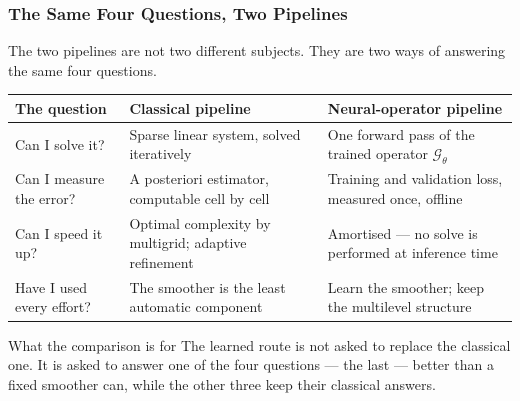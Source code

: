 \frametitle{The Same Four Questions, Two Pipelines}
\small

The two pipelines are not two different subjects. They are two ways of
answering the same four questions.

\vspace{0.4em}
{\centering
\renewcommand{\arraystretch}{1.35}
\begin{tabular}{@{}p{4.6cm} p{9.4cm} p{9.4cm}@{}}
\rowcolor{black!6}
\textbf{The question} & \textbf{Classical pipeline} & \textbf{Neural-operator pipeline}\\
\hline
Can I solve it?
  & Sparse linear system, solved iteratively
  & One forward pass of the trained operator $\mathcal{G}_\theta$\\
Can I measure the error?
  & \alert{A posteriori} estimator, computable cell by cell
  & Training and validation loss, measured once, offline\\
Can I speed it up?
  & \alert{Optimal complexity} by multigrid; adaptive refinement
  & Amortised --- no solve is performed at inference time\\
Have I used every effort?
  & The smoother is the \alert{least automatic} component
  & \alert{Learn the smoother}; keep the multilevel structure\\
\end{tabular}\par}

\vspace{0.4em}
\begin{block}{What the comparison is for}
The learned route is not asked to replace the classical one. It is asked to
answer \alert{one} of the four questions --- the last --- better than a fixed
smoother can, while the other three keep their classical answers.
\end{block}
